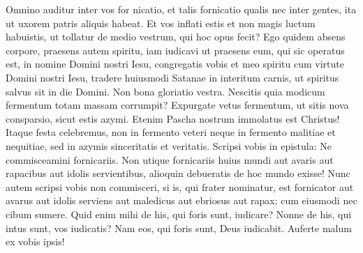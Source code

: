 \begin{biblechapter} 
\verse Omnino auditur inter vos for nicatio, et talis fornicatio qualis nec inter gentes, ita ut uxorem patris aliquis habeat. 
\verse Et vos inflati estis et non magis luctum habuistis, ut tollatur de medio vestrum, qui hoc opus fecit? 
\verse Ego quidem absens corpore, praesens autem spiritu, iam iudicavi ut praesens eum, qui sic operatus est, 
\verse in nomine Domini nostri Iesu, congregatis vobis et meo spiritu cum virtute Domini nostri Iesu, 
\verse tradere huiusmodi Satanae in interitum carnis, ut spiritus salvus sit in die Domini. 
\verse Non bona gloriatio vestra. Nescitis quia modicum fermentum totam massam corrumpit? 
\verse Expurgate vetus fermentum, ut sitis nova consparsio, sicut estis azymi. Etenim Pascha nostrum immolatus est Christus! 
\verse Itaque festa celebremus, non in fermento veteri neque in fermento malitiae et nequitiae, sed in azymis sinceritatis et veritatis. 
\verse Scripsi vobis in epistula: Ne commisceamini fornicariis. 
\verse Non utique fornicariis huius mundi aut avaris aut rapacibus aut idolis servientibus, alioquin debueratis de hoc mundo exisse! 
\verse Nunc autem scripsi vobis non commisceri, si is, qui frater nominatur, est fornicator aut avarus aut idolis serviens aut maledicus aut ebriosus aut rapax; cum eiusmodi nec cibum sumere.  
\verse Quid enim mihi de his, qui foris sunt, iudicare? Nonne de his, qui intus sunt, vos iudicatis? 
\verse Nam eos, qui foris sunt, Deus iudicabit. Auferte malum ex vobis ipsis! 
\end{biblechapter}

